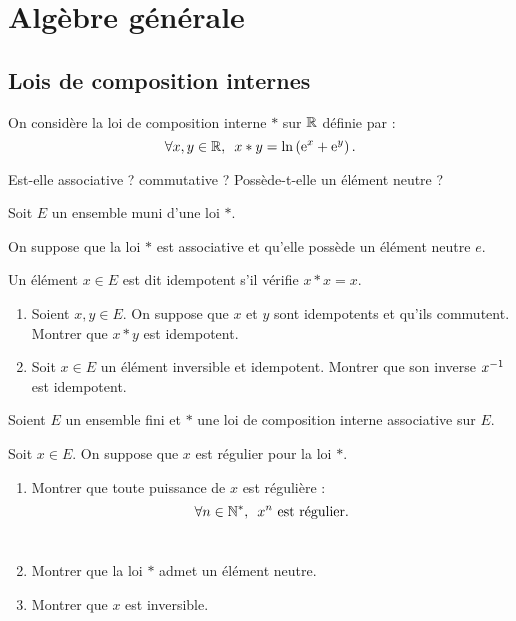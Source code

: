 \chapter{Algèbre générale}

\minitoc

\section{Lois de composition internes}

\begin{exo}[Exercice 1]
On considère la loi de composition interne \(*\) sur \(\mathbb{R}\) définie par : \[\quantifs{\forall x,y\in\R}x*y=\ln\paren{\e{x}+\e{y}}.\]

Est-elle associative ? commutative ? Possède-t-elle un élément neutre ?
\end{exo}

\begin{corr}
\end{corr}

\begin{exo}[Exercice 2]
Soit \(E\) un ensemble muni d'une loi \(*\).

On suppose que la loi \(*\) est associative et qu'elle possède un élément neutre \(e\).

Un élément \(x\in E\) est dit idempotent s'il vérifie \(x*x=x\).

\begin{enumerate}
\item Soient \(x,y\in E\). On suppose que \(x\) et \(y\) sont idempotents et qu'ils commutent. Montrer que \(x*y\) est idempotent. \\

\item Soit \(x\in E\) un élément inversible et idempotent. Montrer que son inverse \(x^{-1}\) est idempotent.
\end{enumerate}
\end{exo}

\begin{corr}
\end{corr}

\begin{exo}
Soient \(E\) un ensemble fini et \(*\) une loi de composition interne associative sur \(E\).

Soit \(x\in E\). On suppose que \(x\) est régulier pour la loi \(*\).

\begin{enumerate}
\item Montrer que toute puissance de \(x\) est régulière : \[\quantifs{\forall n\in\Ns}x^n\text{ est régulier}.\] \\

\item Montrer que la loi \(*\) admet un élément neutre. \\

\item Montrer que \(x\) est inversible.
\end{enumerate}
\end{exo}

